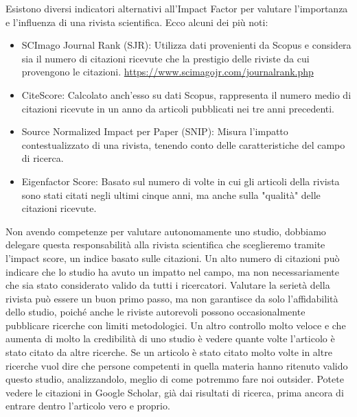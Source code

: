 \documentclass[12pt]{book} %
\begin{document}
Esistono diversi indicatori alternativi all'Impact Factor per valutare l'importanza e l'influenza di una rivista
scientifica. Ecco alcuni dei più noti:

\begin{itemize}
\item SCImago Journal Rank (SJR): Utilizza dati provenienti da Scopus e considera sia il numero di citazioni ricevute
che la prestigio delle riviste da cui provengono le citazioni. \url{https://www.scimagojr.com/journalrank.php} 
\item CiteScore: Calcolato anch'esso su dati Scopus, rappresenta il numero medio di citazioni ricevute in un anno da
articoli pubblicati nei tre anni precedenti.
\item Source Normalized Impact per Paper (SNIP): Misura l'impatto contestualizzato di una rivista, tenendo conto delle
caratteristiche del campo di ricerca.
\item Eigenfactor Score: Basato sul numero di volte in cui gli articoli della rivista sono stati citati negli ultimi
cinque anni, ma anche sulla "qualità" delle citazioni ricevute.
\end{itemize}

\bigskip

Non avendo competenze per valutare autonomamente uno studio, dobbiamo delegare questa responsabilità alla rivista
scientifica che sceglieremo tramite l'impact score, un indice basato sulle citazioni. Un alto numero di citazioni può indicare che lo studio ha avuto un impatto nel campo, ma non necessariamente che sia stato considerato valido da tutti i ricercatori. Valutare la serietà della rivista può essere un buon primo passo, ma non garantisce da solo l’affidabilità dello studio, poiché anche le riviste autorevoli possono occasionalmente pubblicare ricerche con limiti metodologici. Un altro controllo molto veloce e che aumenta di molto la credibilità di uno
studio è vedere quante volte l'articolo è stato citato da altre ricerche. Se un articolo è stato
citato molto volte in altre ricerche vuol dire che persone competenti in quella materia hanno ritenuto valido questo
studio, analizzandolo, meglio di come potremmo fare noi outsider. Potete vedere le citazioni in Google Scholar, già dai
risultati di ricerca, prima ancora di entrare dentro l'articolo vero e proprio.
\end{document}
